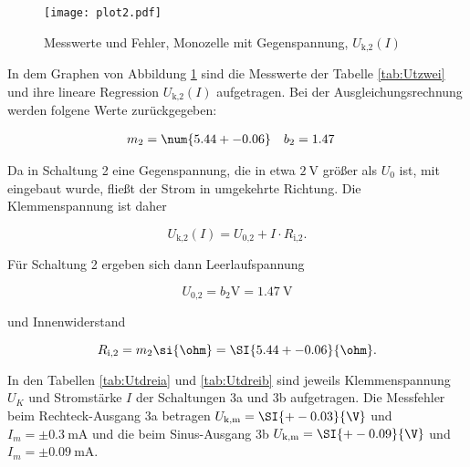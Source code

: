   \begin{figure}[h]
    \centering
    \texttt{[image: plot2.pdf]}
    \caption{Messwerte und Fehler, Monozelle mit Gegenspannung, $U_\text{k,2}(I)$}
    \label{fig:Uzwei}
  \end{figure}

  In dem Graphen von Abbildung \ref{fig:Uzwei} sind die Messwerte der Tabelle
  \ref{tab:Utzwei} und ihre lineare Regression
  $U_\text{k,2}(I)$ aufgetragen.
  Bei der Ausgleichungsrechnung werden folgene Werte zurückgegeben:

  \begin{align}
    m_2 & = \num{5.44 +- 0.06} & b_2 & = 1.47
  \end{align}

  Da in Schaltung 2 eine Gegenspannung, die in etwa $\SI{2}{\V}$ größer als
  $U_0$ ist, mit eingebaut wurde, fließt der Strom in umgekehrte Richtung.
  Die Klemmenspannung ist daher

  \begin{equation}
    U_\text{k,2}(I) = U_\text{0,2} + I \cdot R_\text{i,2}.
  \end{equation}

  Für Schaltung 2 ergeben sich dann Leerlaufspannung

  \begin{equation}
    U_\text{0,2} = b_2 \si{\V} = \SI{1.47}{\V}
  \end{equation}

  und Innenwiderstand

  \begin{equation}
    R_\text{i,2} = m_2 \si{\ohm} = \SI{5.44 +- 0.06}{\ohm}.
  \end{equation}

  In den Tabellen \ref{tab:Utdreia} und \ref{tab:Utdreib} sind jeweils
  Klemmenspannung $U_K$ und Stromstärke $I$
  der Schaltungen 3a und 3b aufgetragen.
  Die Messfehler beim Rechteck-Ausgang 3a betragen
  $U_\text{k,m} = \SI{+-0.03}{\V}$ und $I_m = \pm \SI{0.3}{\milli\A}$ und die
  beim Sinus-Ausgang 3b $U_\text{k,m} = \SI{+-0.09}{\V}$ und
  $I_m = \pm \SI{0.09}{\milli\A}$.

